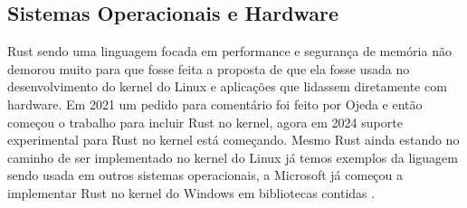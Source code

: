\subsection{Sistemas Operacionais e Hardware}
Rust sendo uma linguagem focada em performance e seguran\c{c}a de mem\'{o}ria n\~{a}o demorou muito para que fosse feita a proposta de que ela fosse usada no desenvolvimento do kernel do Linux e aplica\c{c}\~{o}es que lidassem diretamente com hardware. Em 2021 um pedido para coment\'{a}rio foi feito por Ojeda e ent\~{a}o come\c{c}ou o trabalho para incluir Rust no kernel, agora em 2024 suporte experimental para Rust no kernel est\'{a} come\c{c}ando. Mesmo Rust ainda estando no caminho de ser implementado no kernel do Linux j\'{a} temos exemplos da liguagem sendo usada em outros sistemas operacionais, a Microsoft j\'{a} come\c{c}ou a implementar Rust no kernel do Windows em bibliotecas contidas \cite{Wes23}.
